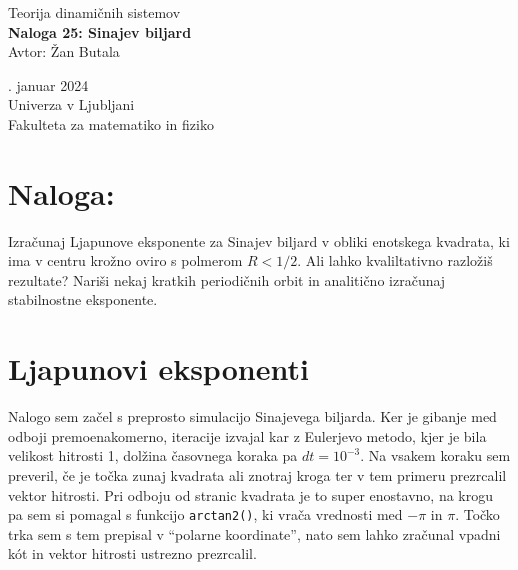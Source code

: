 \documentclass[11pt]{article}
\newcommand{\q}[1]{``#1''}
\begin{document}
\begin{titlepage}
\begin{center}
	
	{\sc\Large	Teorija dinamičnih sistemov}\\
	\vspace*{5cm}
	\LARGE\textbf{Naloga 25: Sinajev biljard}\\
	\vspace{0.2cm}
	\vspace{1.6cm}
	\large{Avtor: Žan Butala}\\
 

       \vspace{5cm}



       \vfill

	\normalsize
 
       {. januar 2024\\
	\vspace{0.2cm}
       Univerza v Ljubljani\\
       Fakulteta za matematiko in fiziko\\}
      
\end{center}
\end{titlepage}


\newpage

\section{Naloga:}
Izračunaj Ljapunove eksponente za Sinajev biljard v obliki enotskega kvadrata, ki ima v centru krožno oviro s polmerom $R < 1/2$.
Ali lahko kvaliltativno razložiš rezultate? Nariši nekaj kratkih periodičnih orbit in analitično izračunaj stabilnostne eksponente.






\vspace*{2cm}

\section{Ljapunovi eksponenti}
Nalogo sem začel s preprosto simulacijo Sinajevega biljarda.
Ker je gibanje med odboji premoenakomerno, iteracije izvajal kar z Eulerjevo metodo, kjer je bila velikost hitrosti 1, dolžina časovnega koraka pa $dt =10^{-3}$.
Na vsakem koraku sem preveril, če je točka zunaj kvadrata ali znotraj kroga ter v tem primeru prezrcalil vektor hitrosti.
Pri odboju od stranic kvadrata je to super enostavno, na krogu pa sem si pomagal s funkcijo \texttt{arctan2()}, ki vrača vrednosti med $-\pi$ in $\pi$.
Točko trka sem s tem prepisal v \q{polarne koordinate}, nato sem lahko zračunal vpadni k\'ot in vektor hitrosti ustrezno prezrcalil.
\end{document}
